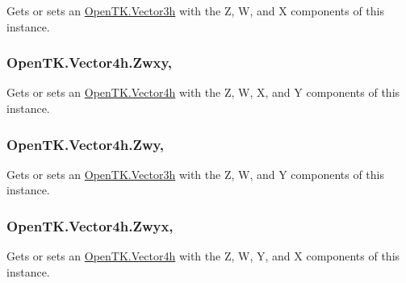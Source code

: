 Gets or sets an \hyperlink{struct_open_t_k_1_1_vector3h}{Open\-T\-K.\-Vector3h} with the Z, W, and X components of this instance. 

\hypertarget{struct_open_t_k_1_1_vector4h_a26b57ad95e2010c6b2087ac814d84381}{
\subsubsection[{Zwxy}]{ Open\-T\-K.\-Vector4h.\-Zwxy\hspace{0.3cm}{\ttfamily [get]}, {\ttfamily [set]}}}\label{struct_open_t_k_1_1_vector4h_a26b57ad95e2010c6b2087ac814d84381}


Gets or sets an \hyperlink{struct_open_t_k_1_1_vector4h}{Open\-T\-K.\-Vector4h} with the Z, W, X, and Y components of this instance. 

\hypertarget{struct_open_t_k_1_1_vector4h_a4c6963a1a4c2a981ffe0d19e4ff6258c}{
\subsubsection[{Zwy}]{ Open\-T\-K.\-Vector4h.\-Zwy\hspace{0.3cm}{\ttfamily [get]}, {\ttfamily [set]}}}\label{struct_open_t_k_1_1_vector4h_a4c6963a1a4c2a981ffe0d19e4ff6258c}


Gets or sets an \hyperlink{struct_open_t_k_1_1_vector3h}{Open\-T\-K.\-Vector3h} with the Z, W, and Y components of this instance. 

\hypertarget{struct_open_t_k_1_1_vector4h_a3c13dce4324c20ce89b374eb7c4dc963}{
\subsubsection[{Zwyx}]{ Open\-T\-K.\-Vector4h.\-Zwyx\hspace{0.3cm}{\ttfamily [get]}, {\ttfamily [set]}}}\label{struct_open_t_k_1_1_vector4h_a3c13dce4324c20ce89b374eb7c4dc963}


Gets or sets an \hyperlink{struct_open_t_k_1_1_vector4h}{Open\-T\-K.\-Vector4h} with the Z, W, Y, and X components of this instance. 

